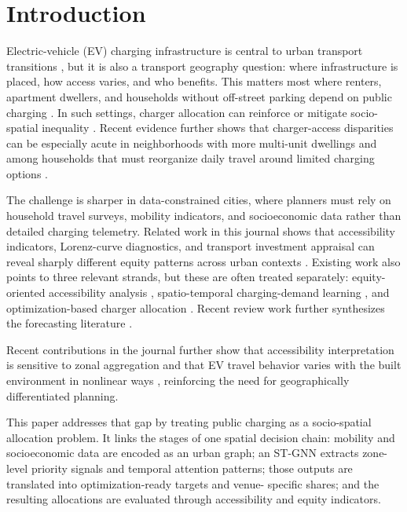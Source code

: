\documentclass[final,5p,times,twocolumn,authoryear]{elsarticle}
\begin{document}

\section{Introduction}

Electric-vehicle (EV) charging infrastructure is central to urban transport transitions
\citep{Hopkins2023,Varghese2024}, but it is also a transport geography question: where
infrastructure is placed, how access varies, and who benefits. This matters most where
renters, apartment dwellers, and households without off-street parking depend on public
charging \citep{Hardman2018,Neaimeh2017,Mandolakani2024,Chen2025Equity}. In such settings,
charger allocation can reinforce or mitigate socio-spatial inequality
\citep{Carlton2024,Yu2025}.
Recent evidence further shows that charger-access disparities can be especially acute in
neighborhoods with more multi-unit dwellings and among households that must reorganize daily
travel around limited charging options \citep{HsuFingerman2021,Gan2023MUD,Malabanan2026}.

The challenge is sharper in data-constrained cities, where planners must rely on household
travel surveys, mobility indicators, and socioeconomic data rather than detailed charging
telemetry. Related work in this journal shows that accessibility indicators, Lorenz-curve
diagnostics, and transport investment appraisal can reveal sharply different equity patterns
across urban contexts \citep{Geurs2004,Delbosc2011,Bocarejo2012}. Existing work also points
to three relevant strands, but these are often treated separately: equity-oriented
accessibility analysis \citep{Hopkins2023,Varghese2024,Jiao2024,Lezcano2025},
spatio-temporal charging-demand learning
\citep{Wang2023HSTGCN,Cavus2025HCBNet,Wang2023LSTM,Wang2025iScience}, and
optimization-based charger allocation \citep{Zhang2023,Qiao2023,Zhou2023,Li2024,Sun2025}.
Recent review work further synthesizes the forecasting literature \citep{Alaraj2025}.

Recent contributions in the journal further show that accessibility interpretation is
sensitive to zonal aggregation \citep{Qu2026} and that EV travel behavior varies with the
built environment in nonlinear ways \citep{Tian2026}, reinforcing the need for
geographically differentiated planning.

This paper addresses that gap by treating public charging as a socio-spatial allocation
problem. It links the stages of one spatial decision chain: mobility and socioeconomic data
are encoded as an urban graph; an ST-GNN extracts zone-level priority signals and temporal
attention patterns; those outputs are translated into optimization-ready targets and venue-
specific shares; and the resulting allocations are evaluated through accessibility and
equity indicators.
\end{document}
